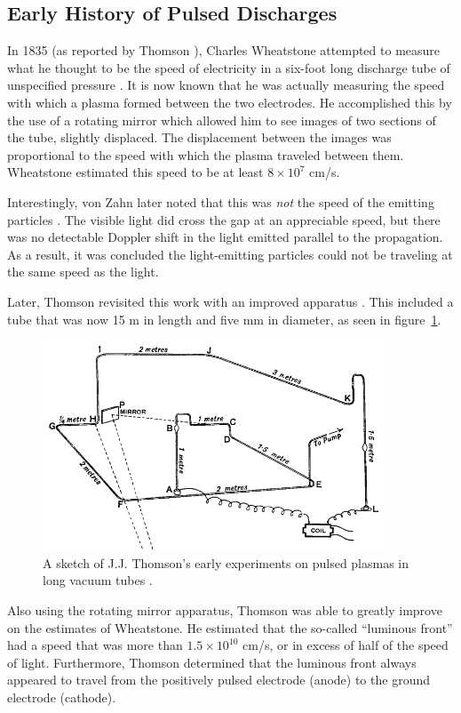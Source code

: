 \subsection{Early History of Pulsed Discharges}

In 1835 (as reported by Thomson \cite{Thomson1893}), Charles Wheatstone
attempted to measure what he thought to be the speed of electricity in a
six-foot long discharge tube of unspecified pressure \cite{Wheatstone1835}. It
is now known that he was actually measuring the speed with which a plasma formed
between the two electrodes. He accomplished this by the use of a rotating mirror
which allowed him to see images of two sections of the tube, slightly displaced.
The displacement between the images was proportional to the speed with which the
plasma traveled between them. Wheatstone estimated this speed to be at least
$8\times10^7$ cm/s.

Interestingly, von Zahn later noted that this was \emph{not} the speed of the
emitting particles \cite{Zahn1879}. The visible light did cross the gap at an
appreciable speed, but there was no detectable Doppler shift in the light
emitted parallel to the propagation. As a result, it was concluded the
light-emitting particles could not be traveling at the same speed as the light.

Later, Thomson revisited this work with an improved apparatus
\cite{Thomson1893}. This included a tube that was now 15 m in length and five mm
in diameter, as seen in figure~\ref{fig:thomson}.
\begin{figure}
  \centering
  \includegraphics[width=4in]{chapters/introduction/figures/thomson.png}
  \caption{A sketch of J.J. Thomson's early experiments on pulsed plasmas 
  in long vacuum tubes \cite{Thomson1893}.}\label{fig:thomson}
\end{figure}
Also using the rotating mirror apparatus, Thomson was able to greatly improve on
the estimates of Wheatstone. He estimated that the so-called ``luminous front''
had a speed that was more than $1.5\times10^{10}$ cm/s, or in excess of half of
the speed of light. Furthermore, Thomson determined that the luminous front
always appeared to travel from the positively pulsed electrode (anode) to the
ground electrode (cathode).

